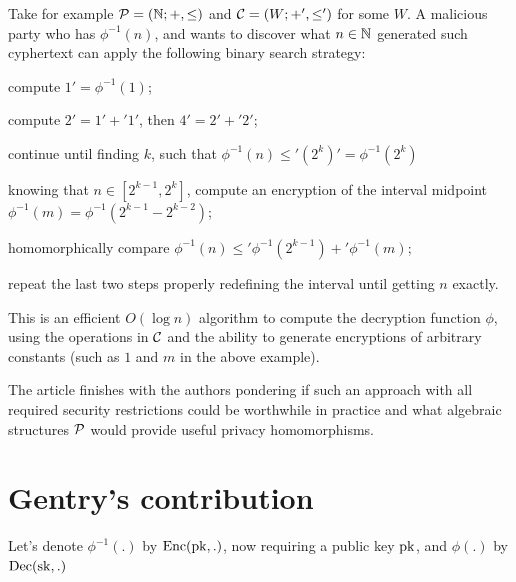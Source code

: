 Take for example $\mathcal P = (\mathbb{N};+,\leq)$ and $\mathcal C = (W;+',\leq')$ for some $W$. A malicious party who has $\phi^{-1}(n)$, and wants to discover what $n\in\mathbb{N}$ generated such cyphertext can apply the following binary search strategy:
\begin{alineas}
\item compute $1'=\phi^{-1}(1)$;
\item compute $2'=1'+'1'$, then $4'=2'+'2'$;
\item continue until finding $k$, such that $\phi^{-1}(n)\leq'(2^k)'=\phi^{-1}(2^k)$
\item knowing that $n\in[2^{k-1},2^{k}]$, compute an encryption of the interval midpoint $\phi^{-1}(m)=\phi^{-1}(2^{k-1}-2^{k-2})$;
\item homomorphically compare $\phi^{-1}(n)\leq'\phi^{-1}(2^{k-1})+'\phi^{-1}(m)$;
\item repeat the last two steps properly redefining the interval until getting $n$ exactly.
\end{alineas}
This is an efficient $O(\log n)$ algorithm to compute the decryption function $\phi$, using the operations in $\mathcal C$ and the ability to generate encryptions of arbitrary constants (such as $1$ and $m$ in the above example).

The article finishes with the authors pondering if such an approach with all required security restrictions could be worthwhile in practice and what algebraic structures $\mathcal P$ would provide useful privacy homomorphisms.

\section{Gentry's contribution}
\label{sec:gentry}
Let's denote $\phi^{-1}(.)$ by $\operatorname{Enc}(\operatorname{pk},.)$, now requiring a public key $\operatorname{pk}$, and $\phi(.)$ by $\operatorname{Dec}(\operatorname{sk},.)$


